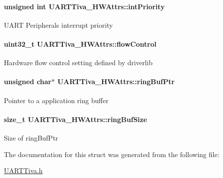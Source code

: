 \paragraph[{int\+Priority}]{\setlength{\rightskip}{0pt plus 5cm}unsigned int U\+A\+R\+T\+Tiva\+\_\+\+H\+W\+Attrs\+::int\+Priority}\label{struct_u_a_r_t_tiva___h_w_attrs_ae442562721bedb759753fdfba3bcb93b}
U\+A\+R\+T Peripheral\textquotesingle{}s interrupt priority 
\paragraph[{flow\+Control}]{\setlength{\rightskip}{0pt plus 5cm}uint32\+\_\+t U\+A\+R\+T\+Tiva\+\_\+\+H\+W\+Attrs\+::flow\+Control}\label{struct_u_a_r_t_tiva___h_w_attrs_ad8f36b7ebba17d7cecf8cc6bb3bac8ed}
Hardware flow control setting defined by driverlib 
\paragraph[{ring\+Buf\+Ptr}]{\setlength{\rightskip}{0pt plus 5cm}unsigned char$\ast$ U\+A\+R\+T\+Tiva\+\_\+\+H\+W\+Attrs\+::ring\+Buf\+Ptr}\label{struct_u_a_r_t_tiva___h_w_attrs_a6382c2f9dc1fc1648e051d002a5c8521}
Pointer to a application ring buffer 
\paragraph[{ring\+Buf\+Size}]{\setlength{\rightskip}{0pt plus 5cm}size\+\_\+t U\+A\+R\+T\+Tiva\+\_\+\+H\+W\+Attrs\+::ring\+Buf\+Size}\label{struct_u_a_r_t_tiva___h_w_attrs_a71cdbd83ab94cd22b14da7204cd80b0d}
Size of ring\+Buf\+Ptr 

The documentation for this struct was generated from the following file\+:\begin{DoxyCompactItemize}
\item 
\hyperlink{_u_a_r_t_tiva_8h}{U\+A\+R\+T\+Tiva.\+h}\end{DoxyCompactItemize}
